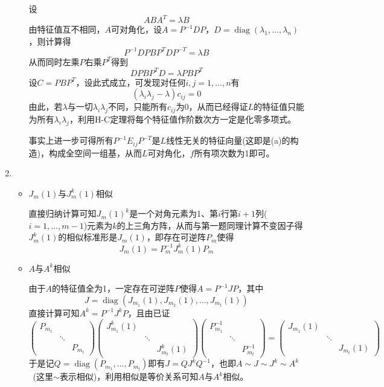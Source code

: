 \documentclass[a4paper,UTF8,fontset=windows,AutoFakeBold]{ctexart}
\DeclareMathOperator{\diag}{diag}
\newcommand*{\note}{\noindent *}
\begin{document}
\begin{enumerate}
\begin{enumerate}
        设
        $$ABA^T=\lambda B$$
        由特征值互不相同，$A$可对角化，设$A=P^{-1}DP$，$D=\diag(\lambda_1,\dots,\lambda_n)$，则计算得
        $$P^{-1}DPBP^TDP^{-T}=\lambda B$$
        从而同时左乘$P$右乘$P^T$得到
        $$DPBP^TD=\lambda PBP^T$$
        设$C=PBP^T$，设此式成立，可发现对任何$i,j=1,\dots,n$有
        $$(\lambda_i\lambda_j-\lambda)c_{ij}=0$$
        由此，若$\lambda$与一切$\lambda_i\lambda_j$不同，只能所有$c_{ij}$为0，从而已经得证$L$的特征值只能为所有$\lambda_i\lambda_j$，利用H-C定理将每个特征值作阶数次方一定是化零多项式。

        \note 事实上进一步可得所有$P^{-1}E_{ij}P^{-T}$是$L$线性无关的特征向量(这即是(a)的构造)，构成全空间一组基，从而$L$可对角化，$f$所有项次数为1即可。
    \end{enumerate}

    \item
    \begin{itemize}
        \item $J_m(1)$与$J_m^k(1)$相似
        
        直接归纳计算可知$J_m(1)^k$是一个对角元素为1、第$i$行第$i+1$列($i=1,\dots,m-1$)元素为$k$的上三角方阵，从而与第一题同理计算不变因子得$J_m^k(1)$的相似标准形是$J_m(1)$，即存在可逆阵$P_m$使得
        $$J_m(1)=P_m^{-1}J_m^k(1)P_m$$

        \item $A$与$A^k$相似
        
        由于$A$的特征值全为1，一定存在可逆阵$P$使得$A=P^{-1}JP$，其中
        $$J=\diag(J_{m_1}(1),J_{m_2}(1),\dots,J_{m_t}(1))$$
        直接计算可知$A^k=P^{-1}J^kP$，且由已证
        $$\begin{pmatrix}P_{m_1}\\ &\ddots\\ &&P_{m_t}\end{pmatrix}\begin{pmatrix}J_{m_1}^k(1)\\ &\ddots\\ &&J_{m_t}^k(1)\end{pmatrix}\begin{pmatrix}P_{m_1}^{-1}\\ &\ddots\\ &&P_{m_t}^{-1}\end{pmatrix}=\begin{pmatrix}J_{m_1}(1)\\ &\ddots\\ &&J_{m_t}(1)\end{pmatrix}$$
        于是记$Q=\diag(P_{m_1},\dots,P_{m_t})$即有$J=QJ^kQ^{-1}$，也即$A\sim J\sim J^k\sim A^k$\ (这里$\sim$表示相似)，利用相似是等价关系可知$A$与$A^k$相似。
    \end{itemize}
\end{enumerate}
\end{document}
